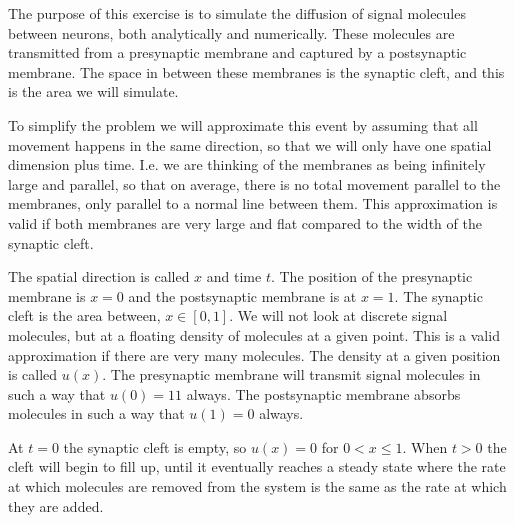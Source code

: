 The purpose of this exercise is to simulate the diffusion of signal
molecules between neurons, both analytically and numerically. These
molecules are transmitted from a presynaptic membrane and captured
by a postsynaptic membrane. The space in between these membranes is
the synaptic cleft, and this is the area we will simulate.

To simplify the problem we will approximate this event by assuming
that all movement happens in the same direction, so that we will
only have one spatial dimension plus time. I.e. we are thinking of
the membranes as being infinitely large and parallel, so that on
average, there is no total movement parallel to the membranes, only
parallel to a normal line between them. This approximation is valid
if both membranes are very large and flat compared to the width of
the synaptic cleft.

The spatial direction is called $x$ and time $t$. The position of
the presynaptic membrane is $x=0$ and the postsynaptic membrane is
at $x=1$. The synaptic cleft is the area between, $x \in [0,1]$. We
will not look at discrete signal molecules, but at a floating
density of molecules at a given point. This is a valid
approximation if there are very many molecules. The density at a
given position is called $u(x)$. The presynaptic membrane will
transmit signal molecules in such a way that $u(0)=11$ always. The
postsynaptic membrane absorbs molecules in such a way that $u(1)=0$
always.

At $t=0$ the synaptic cleft is empty, so $u(x)=0$  for $0 < x \leq
1$. When $t > 0$ the cleft will begin to fill up, until it
eventually reaches a steady state where the rate at which molecules
are removed from the system is the same as the rate at which they
are added.
